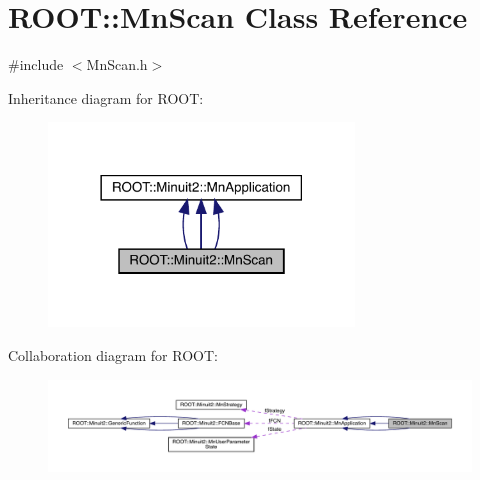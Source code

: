 \hypertarget{classROOT_1_1Minuit2_1_1MnScan}{}\section{R\+O\+OT\+:\+:Mn\+Scan Class Reference}
\label{classROOT_1_1Minuit2_1_1MnScan}


{\ttfamily \#include $<$Mn\+Scan.\+h$>$}



Inheritance diagram for R\+O\+OT\+:
\nopagebreak
\begin{figure}[H]
\begin{center}
\leavevmode
\includegraphics[width=230pt]{d3/dcb/classROOT_1_1Minuit2_1_1MnScan__inherit__graph}
\end{center}
\end{figure}


Collaboration diagram for R\+O\+OT\+:
\nopagebreak
\begin{figure}[H]
\begin{center}
\leavevmode
\includegraphics[width=350pt]{de/ddf/classROOT_1_1Minuit2_1_1MnScan__coll__graph}
\end{center}
\end{figure}
